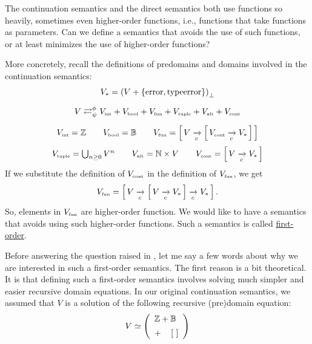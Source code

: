 \begin{enumcirc}
	\item
	The continuation semantics and the direct semantics both use functions so
	heavily, sometimes even higher-order functions, i.e., functions that take
	functions as parameters.
	Can we define a semantics that avoids the use of such functions, or at least
	minimizes the use of higher-order functions?

	More concretely, recall the definitions of predomains and domains involved in
	the continuation semantics:
	\[
		\begin{array}{c}
			V_*                  =
			\left( V + \left\{ \textrm{error}, \textrm{typeerror} \right\} \right)_\bot                                                                    \\[1em]
			V                    \mathrel{\mathop{\rightleftarrows}^{\mathrm{\phi}}_{\mathrm{\psi}}}
			V_{\textrm{\tiny int}} + V_{\textrm{\tiny bool}} + V_{\textrm{\tiny fun}} + V_{\textrm{\tiny tuple}} + V_{\textrm{\tiny alt}} + V_{\textrm{\tiny cont}} \\[1em]
			V_{\textrm{\tiny int}}   =
			\mathbb{Z} \qquad
			V_{\textrm{\tiny bool}}  = \mathbb{B} \qquad
			V_{\textrm{\tiny fun}}   = \left[ \, V \xrightarrow[c]{} \left[ \, V_{\textrm{\tiny cont}} \xrightarrow[c]{} V_* \, \right] \, \right]                                                \\[1em]
			V_{\textrm{\tiny tuple}} = \bigcup_{n \ge 0} V^n \qquad V_{\textrm{\tiny alt}} = \mathbb{N} \times V \qquad V_{\textrm{\tiny cont}} = \left[ \, V \xrightarrow[c]{} V_* \, \right]
		\end{array}
	\]
	If we substitute the definition of $V_{\textrm{\tiny cont}}$ in the definition of
	$V_{\textrm{\tiny fun}}$, we get
	\[
		V_{\textrm{\tiny fun}} = \left[ \, V \xrightarrow[c]{} \left[ \, V \xrightarrow[c]{} V_* \, \right] \xrightarrow[c]{} V_* \, \right].
	\]
	So, elements in $V_{\textrm{\tiny fun}}$ are higher-order function.
	We would like to have a semantics that avoids using such higher-order
	functions.
	Such a semantics is called \ul{first-order}.
	\item
	Before answering the question raised in , let me say a few words
	about why we are interested in such a first-order semantics.
	The first reason is a bit theoretical.
	It is that defining such a first-order semantics involves solving much simpler
	and easier recursive domain equations.
	In our original continuation semantics, we assumed that $V$ is a solution of
	the following recursive (pre)domain equation:
	\[
		V \simeq \left( 
			\begin{array}{l}
				\mathbb{Z} + \mathbb{B}                                  \\[0.5em]
				+ \quad \left[ \, 
 \, \right]
\end{array} \right)\]
\end{enumcirc}
